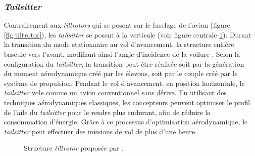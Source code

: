         \subsubsection*{\textit{Tailsitter}}
        Contrairement aux \textit{tiltrotors} qui se posent sur le fuselage de l'avion (figure \ref{fig:tiltrotor}), les \textit{tailsitter} se posent à la verticale (voir figure centrale \ref{fig:tailsitter}). Durant la transition du mode stationnaire au vol d'avancement, la structure entière bascule vers l'avant, modifiant ainsi l'angle d'incidence de la voilure \cite{RobinRaffaello2017, VerlingWeibelSiegwart2016,smeurINDITail, ChiappinelliNahon2018, tal2022global}. Selon la configuration du \textit{tailsitter}, la transition peut être réalisée soit par la génération du moment aérodynamique créé par les élevons, soit par le couple créé par le système de propulsion. Pendant le vol d'avancement, en position horizontale, le \textit{tailsitter} vole comme un avion conventionnel sans dérive. En utilisant des techniques aérodynamiques classiques, les concepteurs peuvent optimiser le profil de l'aile du \textit{tailsitter} pour le rendre plus endurant, afin de réduire la consommation d'énergie. Grâce à ce processus d'optimisation aérodynamique, le \textit{tailsitter} peut effectuer des missions de vol de plus d'une heure.

        \begin{figure}[ht!]
            \centering
            \caption{Structure \textit{tiltrotor}  proposée par \cite{smeurINDITail,fernandez:hal-04612206,pflimlin:tel-00132352}.}
            \label{fig:tailsitter}
        \end{figure}
        
